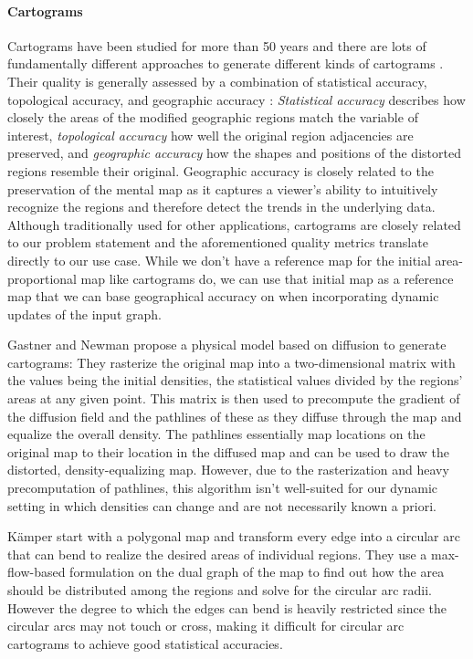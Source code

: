 \paragraph{Cartograms}

Cartograms have been studied for more than 50 years \cite{tobler2004thirty} and there are lots of fundamentally different approaches to generate different kinds of cartograms \cite{nusrat2016state}.
Their quality is generally assessed by a combination of statistical accuracy, topological accuracy, and geographic accuracy \cite{alam2015quantitative}:
\emph{Statistical accuracy} describes how closely the areas of the modified geographic regions match the variable of interest, \emph{topological accuracy} how well the original region adjacencies are preserved, and \emph{geographic accuracy} how the shapes and positions of the distorted regions resemble their original.
Geographic accuracy is closely related to the preservation of the mental map as it captures a viewer's ability to intuitively recognize the regions and therefore detect the trends in the underlying data.
Although traditionally used for other applications, cartograms are closely related to our problem statement and the aforementioned quality metrics translate directly to our use case.
While we don't have a reference map for the initial area-proportional map like cartograms do, we can use that initial map as a reference map that we can base geographical accuracy on when incorporating dynamic updates of the input graph.

Gastner and Newman \cite{gastner2004diffusion} propose a physical model based on diffusion to generate cartograms:
They rasterize the original map into a two-dimensional matrix with the values being the initial densities, \ie{} the statistical values divided by the regions' areas at any given point.
This matrix is then used to precompute the gradient of the diffusion field and the pathlines of these  as they diffuse through the map and equalize the overall density.
The pathlines essentially map locations on the original map to their location in the diffused map and can be used to draw the distorted, density-equalizing map.
However, due to the rasterization and heavy precomputation of pathlines, this algorithm isn't well-suited for our dynamic setting in which densities can change and are not necessarily known a priori.

Kämper \etal{} \cite{kamper2013circular} start with a polygonal map and transform every edge into a circular arc that can bend to realize the desired areas of individual regions.
They use a max-flow-based formulation on the dual graph of the map to find out how the area should be distributed among the regions and solve for the circular arc radii.
However the degree to which the edges can bend is heavily restricted since the circular arcs may not touch or cross, making it difficult for circular arc cartograms to achieve good statistical accuracies.

